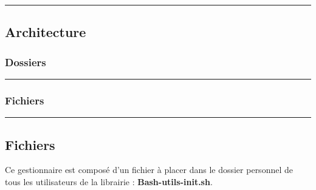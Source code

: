 \documentclass[a4paper,10pt]{article}
\begin{document}


    \color{sec2}\par\noindent\rule{\textwidth}{0.4pt}\color{text}

    \color{sec2}
    \subsection{Architecture}\color{text}

    \color{sec3}
    \subsubsection{Dossiers}\color{text}

    \begin{justify}

    \end{justify}


    \color{sec3}\par\noindent\rule{\textwidth}{0.4pt}\color{text}

    \color{sec3}
    \subsubsection{Fichiers}\color{text}

    \begin{justify}

    \end{justify}




    \color{sec2}\par\noindent\rule{\textwidth}{0.4pt}\color{text}

    \color{sec2}
    \subsection{Fichiers}\color{text}

    \begin{justify}
        Ce gestionnaire est composé d'un fichier à placer dans le dossier personnel de tous les utilisateurs de la librairie :  \textbf{\color{path}Bash-utils-init.sh}.
    \end{justify}
\end{document}
